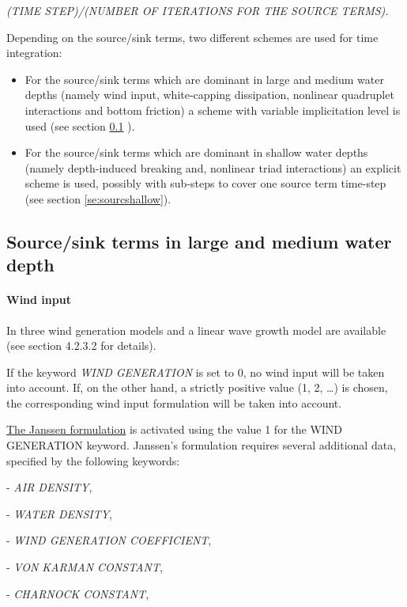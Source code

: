  \textit{(TIME STEP)/(NUMBER OF ITERATIONS FOR THE SOURCE TERMS).}

 Depending on the source/sink terms, two different schemes are used for time integration:

\begin{itemize}
\item  For the source/sink terms which are dominant in large and medium water depths (namely wind input, white-capping dissipation, nonlinear quadruplet interactions and bottom friction) a scheme with variable implicitation level is used (see section \ref{se:sourclarge}
).

\item  For the source/sink terms which are dominant in shallow water depths (namely depth-induced breaking and, nonlinear triad interactions) an explicit scheme is used, possibly with sub-steps to cover one source term time-step (see section \ref{se:sourcshallow}).
\end{itemize}


\subsection{ Source/sink terms in large and medium water depth}
\label{se:sourclarge}

\paragraph{ Wind input}

 In \tomawac three wind generation models and a linear wave growth model are available (see section 4.2.3.2 for details).

 If the keyword \textit{WIND GENERATION} is set to 0, no wind input will be taken into account. If, on the other hand, a strictly positive value (1, 2, \dots ) is chosen, the corresponding wind input formulation will be taken into account.

 \underline{ The Janssen formulation} is activated using the value 1 for the WIND GENERATION keyword. Janssen's formulation requires several additional data, specified by the following keywords:
 
- \textit{AIR DENSITY},

- \textit{WATER DENSITY},  

- \textit{WIND GENERATION COEFFICIENT}, 

- \textit{VON KARMAN CONSTANT}, 

- \textit{CHARNOCK CONSTANT},   

